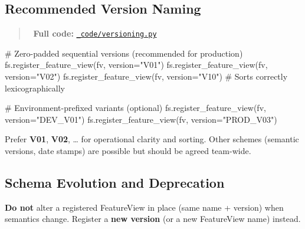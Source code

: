 \documentclass[
  letterpaper,
  DIV=11,
  numbers=noendperiod]{scrreprt}
\newenvironment{Shaded}{\begin{snugshade}}{\end{snugshade}}
\newcommand{\CommentTok}[1]{\textcolor[rgb]{0.37,0.37,0.37}{#1}}
\newcommand{\NormalTok}[1]{\textcolor[rgb]{0.00,0.23,0.31}{#1}}
\newcommand{\OperatorTok}[1]{\textcolor[rgb]{0.37,0.37,0.37}{#1}}
\newcommand{\StringTok}[1]{\textcolor[rgb]{0.13,0.47,0.30}{#1}}
\begin{document}
\hypertarget{recommended-version-naming-1}{%
\subsection{Recommended Version
Naming}\label{recommended-version-naming-1}}

\begin{quote}
📁 \textbf{Full code:}
\href{_code/versioning.py}{\texttt{\_code/versioning.py}}
\end{quote}

\begin{Shaded}
\begin{Highlighting}[]
\CommentTok{\# Zero{-}padded sequential versions (recommended for production)}
\NormalTok{fs.register\_feature\_view(fv, version}\OperatorTok{=}\StringTok{"V01"}\NormalTok{)}
\NormalTok{fs.register\_feature\_view(fv, version}\OperatorTok{=}\StringTok{"V02"}\NormalTok{)}
\NormalTok{fs.register\_feature\_view(fv, version}\OperatorTok{=}\StringTok{"V10"}\NormalTok{)  }\CommentTok{\# Sorts correctly lexicographically}

\CommentTok{\# Environment{-}prefixed variants (optional)}
\NormalTok{fs.register\_feature\_view(fv, version}\OperatorTok{=}\StringTok{"DEV\_V01"}\NormalTok{)}
\NormalTok{fs.register\_feature\_view(fv, version}\OperatorTok{=}\StringTok{"PROD\_V03"}\NormalTok{)}
\end{Highlighting}
\end{Shaded}

Prefer \textbf{V01}, \textbf{V02}, \ldots{} for operational clarity and
sorting. Other schemes (semantic versions, date stamps) are possible but
should be agreed team-wide.

\hypertarget{sec-schema-evolution}{%
\subsection{Schema Evolution and
Deprecation}\label{sec-schema-evolution}}

\begin{tcolorbox}[enhanced jigsaw, title=\textcolor{quarto-callout-warning-color}{\faExclamationTriangle}\hspace{0.5em}{Breaking changes require a new version}, colbacktitle=quarto-callout-warning-color!10!white, rightrule=.15mm, arc=.35mm, colframe=quarto-callout-warning-color-frame, left=2mm, bottomtitle=1mm, toptitle=1mm, breakable, bottomrule=.15mm, opacityback=0, titlerule=0mm, toprule=.15mm, opacitybacktitle=0.6, colback=white, coltitle=black, leftrule=.75mm]

\textbf{Do not} alter a registered FeatureView in place (same name +
version) when semantics change. Register a \textbf{new version} (or a
new FeatureView name) instead.

\end{tcolorbox}
\end{document}
